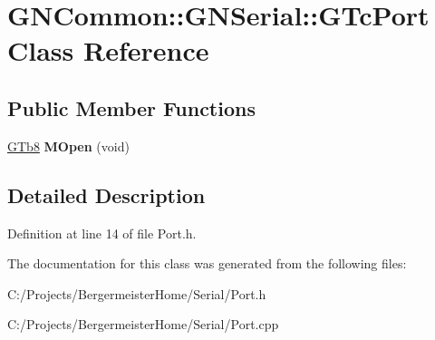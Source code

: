 \hypertarget{class_g_n_common_1_1_g_n_serial_1_1_g_tc_port}{}\section{G\+N\+Common\+:\+:G\+N\+Serial\+:\+:G\+Tc\+Port Class Reference}
\label{class_g_n_common_1_1_g_n_serial_1_1_g_tc_port}
\subsection*{Public Member Functions}
\begin{DoxyCompactItemize}
\item 
\mbox{\label{class_g_n_common_1_1_g_n_serial_1_1_g_tc_port_af8f4ea81da23337f7f0b5ba492d6c310}} 
\mbox{\hyperlink{namespace_g_n_common_a6b5283329f609e2175dd0c91fc1520ba}{G\+Tb8}} {\bfseries M\+Open} (void)
\end{DoxyCompactItemize}


\subsection{Detailed Description}


Definition at line 14 of file Port.\+h.



The documentation for this class was generated from the following files\+:\begin{DoxyCompactItemize}
\item 
C\+:/\+Projects/\+Bergermeister\+Home/\+Serial/Port.\+h\item 
C\+:/\+Projects/\+Bergermeister\+Home/\+Serial/Port.\+cpp\end{DoxyCompactItemize}
